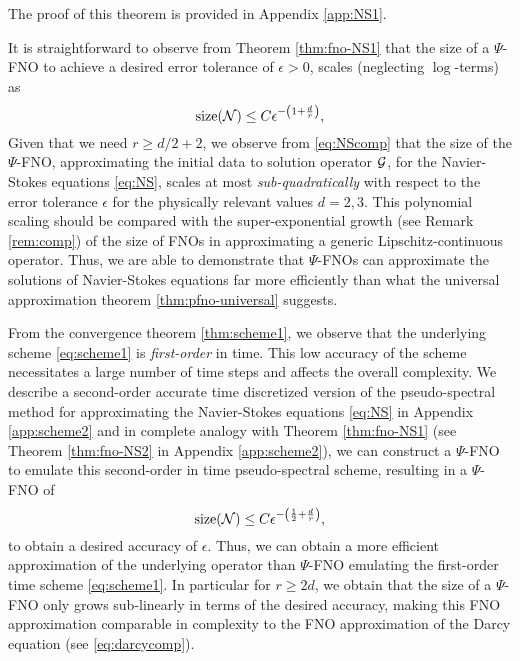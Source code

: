 \documentclass[reqno,a4paper]{amsart}
\begin{document}
The proof of this theorem is provided in Appendix \ref{app:NS1}. 
\begin{remark}
\label{rem:NScomp}
It is straightforward to observe from Theorem \ref{thm:fno-NS1} that the size of a $\Psi$-FNO to achieve a desired error tolerance of $\epsilon > 0$, scales (neglecting $\log$-terms) as
\begin{equation}
\label{eq:NScomp}
\mathrm{size}(\mathcal{N}) \le C\epsilon^{-\left(1+\frac{d}{r}\right)},
\end{equation}
Given that we need $r \geq d/2+2$, we observe from \eqref{eq:NScomp} that the size of the $\Psi$-FNO, approximating the initial data to solution operator $\mathcal{G}$, for the Navier-Stokes equations \eqref{eq:NS}, scales at most \emph{sub-quadratically} with respect to the error tolerance $\epsilon$ for the physically relevant values $d=2,3$. This polynomial scaling should be compared with the super-exponential growth (see Remark \ref{rem:comp}) of the size of FNOs in approximating a generic Lipschitz-continuous operator. Thus, we are able to demonstrate that $\Psi$-FNOs can approximate the solutions of Navier-Stokes equations far more efficiently than what the universal approximation theorem \ref{thm:pfno-universal} suggests. 
\end{remark}
\begin{remark}
\label{rem:scheme2}
From the convergence theorem \ref{thm:scheme1}, we observe that the underlying scheme \eqref{eq:scheme1} is \emph{first-order} in time. This low accuracy of the scheme necessitates a large number of time steps and affects the overall complexity. We describe a second-order accurate time discretized version of the pseudo-spectral method for approximating the Navier-Stokes equations \eqref{eq:NS} in Appendix \ref{app:scheme2} and in complete analogy with Theorem \ref{thm:fno-NS1} (see Theorem \ref{thm:fno-NS2} in Appendix \ref{app:scheme2}), we can construct a $\Psi$-FNO to emulate this second-order in time pseudo-spectral scheme, resulting in a $\Psi$-FNO of
\begin{equation}
\label{eq:NScomp2}
\mathrm{size}(\mathcal{N}) \le C\epsilon^{-\left(\frac{1}{2}+\frac{d}{r}\right)},
\end{equation}
to obtain a desired accuracy of $\epsilon$. Thus, we can obtain a more efficient approximation of the underlying operator than $\Psi$-FNO emulating the first-order time scheme \eqref{eq:scheme1}. In particular for $r \geq 2d$, we obtain that the size of a $\Psi$-FNO only grows sub-linearly in terms of the desired accuracy, making this FNO approximation comparable in complexity to the FNO approximation of the Darcy equation (see \eqref{eq:darcycomp}). 
\end{remark}
\end{document}
